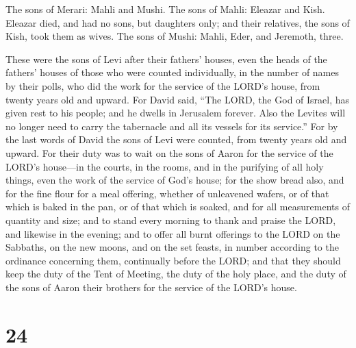  The sons of Merari: Mahli and Mushi. The sons of Mahli:
Eleazar and Kish.  Eleazar died, and had no sons, but
daughters only; and their relatives, the sons of Kish, took them as
wives.  The sons of Mushi: Mahli, Eder, and Jeremoth,
three.

 These were the sons of Levi after their fathers' houses,
even the heads of the fathers' houses of those who were counted
individually, in the number of names by their polls, who did the work
for the service of the LORD's house, from twenty years old and upward.
 For David said, ``The LORD, the God of Israel, has given
rest to his people; and he dwells in Jerusalem forever. 
Also the Levites will no longer need to carry the tabernacle and all its
vessels for its service.''  For by the last words of
David the sons of Levi were counted, from twenty years old and upward.
 For their duty was to wait on the sons of Aaron for the
service of the LORD's house---in the courts, in the rooms, and in the
purifying of all holy things, even the work of the service of God's
house;  for the show bread also, and for the fine flour
for a meal offering, whether of unleavened wafers, or of that which is
baked in the pan, or of that which is soaked, and for all measurements
of quantity and size;  and to stand every morning to
thank and praise the LORD, and likewise in the evening; 
and to offer all burnt offerings to the LORD on the Sabbaths, on the new
moons, and on the set feasts, in number according to the ordinance
concerning them, continually before the LORD;  and that
they should keep the duty of the Tent of Meeting, the duty of the holy
place, and the duty of the sons of Aaron their brothers for the service
of the LORD's house.

\hypertarget{section-23}{%
\section{24}\label{section-23}}


